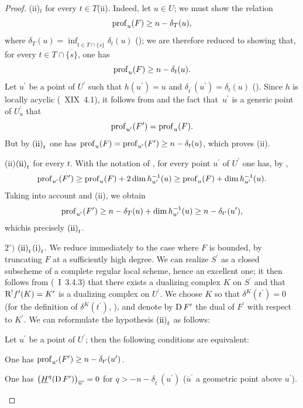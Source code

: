 \begin{proof}
\textup{(ii)}$_{t}$ for every $t\in T$\ALORS\textup{(ii)}. Indeed, let $u\in U$; we must show the relation
$$
\operatorname{prof}_{u}(F)\geq n-\delta_{T}(u),
$$
where $\delta_{T}(u)=\inf_{t\in T\cap\overline{\{ s\} }}\delta_{t}(u)$ (\cf {}); we are therefore reduced to showing that, for every $t\in T\cap\overline{\{ s\} }$, one has
$$
\operatorname{prof}_{u}(F)\geq n-\delta_{t}(u).
$$
Let $u^{\prime}$ be a point of $U^{\prime}$ such that $h(u^{\prime})=u$ and $\delta_{t^{\prime}}(u^{\prime})=\delta_{t}(u)$ (\cf {}). Since $h$ is locally acyclic (~XIX~4.1), it follows from  and the fact that~$u^{\prime}$ is a generic point of $U_{u}^{\prime}$ that
$$
\operatorname{prof}_{u^{\prime}}(F^{\prime})=\operatorname{prof}_{u}(F).
$$
But by $\textup{(ii)}_{t}$ one has $\operatorname{prof}_{u}(F)=\operatorname{prof}_{u^{\prime}}(F^{\prime})\geq n-\delta_{t}(u)$, which proves \textup{(ii)}.

\textup{(ii)}\ALORS$\textup{(ii)}_{t}$ for every $t$. With the notation of , for every point $u^{\prime}$ of $U^{\prime}$ one has, by ,
$$
\operatorname{prof}_{u^{\prime}}(F^{\prime})\geq\operatorname{prof}_{u}(F)+2\dim h_{u^{\prime}}^{-1}(u)\geq\operatorname{prof}_{u}(F)+\dim h_{u^{\prime}}^{-1}(u).
$$
Taking into account  and \textup{(ii)}, we obtain
$$
\operatorname{prof}_{u^{\prime}}(F^{\prime})\geq n-\delta_{T}(u)+\dim h_{u^{\prime}}^{-1}(u)\geq n-\delta_{t^{\prime}}(u^{\prime}),
$$
which\pageoriginaled is precisely $\textup{(ii)}_{t}$.

$2^\circ)$ $\textup{(ii)}_{t}$\SSI$\textup{(i)}_{t}$. We reduce immediately to the case where $F$ is bounded, by truncating $F$ at a sufficiently high degree. We can realize $S^{\prime}$ as a closed subscheme of a complete regular local scheme, hence an excellent one; it then follows from (~I~3.4.3) that there exists a dualizing complex $K$ on $S^{\prime}$ and that $\mathrm R^{!}f^{\prime}(K)=K^{\prime}$ is a dualizing complex on $U^{\prime}$. We choose $K$ so that $\delta^{K}(t^{\prime})=0$ (for the definition of $\delta^{K}(t^{\prime})$, \cf {}), and denote by $\operatorname{D} F^{\prime}$ the dual of $F^{\prime}$ with respect to $K^{\prime}$. We can reformulate the hypothesis $\textup{(ii)}_{t}$ as follows:

\begin{sublemme} \label{XIV.4.2.2}
Let $u^{\prime}$ be a point of $U^{\prime}$; then the following conditions are equivalent:
\begin{enumeratei}
\item
One has $\operatorname{prof}_{u^{\prime}}(F^{\prime})\geq n-\delta_{t^{\prime}}(u^{\prime})$.
\item
One has $\big(\underline{H}^{q}(\operatorname{D} F^{\prime}) \big)_{\overline{u}^{\prime}}=0$ for $q>-n-\delta_{t^{\prime}}(u^{\prime})$ ($\overline{u}^{\prime}$ a geometric point above $u^{\prime}$).
\end{enumeratei}
\end{sublemme}


\end{proof}
